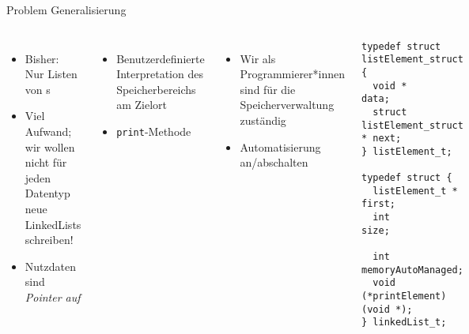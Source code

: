 \begin{frame}[fragile]{Problem Generalisierung}
%
\begin{columns}[T]
\begin{itemize}
\item Bisher: Nur Listen von s
\item Viel Aufwand; wir wollen nicht für jeden Datentyp neue LinkedLists schreiben!
\item[\Thus] Nutzdaten sind \emph{Pointer auf }
\end{itemize}

\vspace{3pt}
\begin{itemize}
\item Benutzerdefinierte Interpretation des Speicherbereichs am Zielort
\item[\Thus] \texttt{print}-Methode
\end{itemize}

\vspace{3pt}
\begin{itemize}
\item Wir als Programmierer*innen sind für die Speicherverwaltung zuständig
\item[\Thus] Automatisierung an/abschalten
\end{itemize}

\vspace{-5pt}
\begin{codebox}
\begin{verbatim}
typedef struct listElement_struct {
  void *                      data;
  struct listElement_struct * next;
} listElement_t;

typedef struct {
  listElement_t * first;
  int             size;
  
  int             memoryAutoManaged;
  void (*printElement)(void *);
} linkedList_t;
\end{verbatim}
\end{codebox}
\end{columns}
%
\end{frame}


